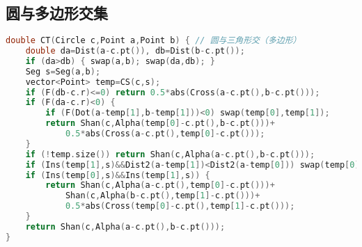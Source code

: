 \documentclass[landscape,a4paper]{article}
\begin{document}
\subsection{圆与多边形交集}
\begin{lstlisting}[language=C++]
double CT(Circle c,Point a,Point b) { // 圆与三角形交（多边形）
	double da=Dist(a-c.pt()), db=Dist(b-c.pt());
	if (da>db) { swap(a,b); swap(da,db); }
	Seg s=Seg(a,b);
	vector<Point> temp=CS(c,s);
	if (F(db-c.r)<=0) return 0.5*abs(Cross(a-c.pt(),b-c.pt()));
	if (F(da-c.r)<0) {
		if (F(Dot(a-temp[1],b-temp[1]))<0) swap(temp[0],temp[1]);
		return Shan(c,Alpha(temp[0]-c.pt(),b-c.pt()))+
			0.5*abs(Cross(a-c.pt(),temp[0]-c.pt()));
	}
	if (!temp.size()) return Shan(c,Alpha(a-c.pt(),b-c.pt()));
	if (Ins(temp[1],s)&&Dist2(a-temp[1])<Dist2(a-temp[0])) swap(temp[0],temp[1]);
	if (Ins(temp[0],s)&&Ins(temp[1],s)) {
		return Shan(c,Alpha(a-c.pt(),temp[0]-c.pt()))+
			Shan(c,Alpha(b-c.pt(),temp[1]-c.pt()))+
			0.5*abs(Cross(temp[0]-c.pt(),temp[1]-c.pt()));
	}
	return Shan(c,Alpha(a-c.pt(),b-c.pt()));
}
\end{lstlisting}
\end{document}
